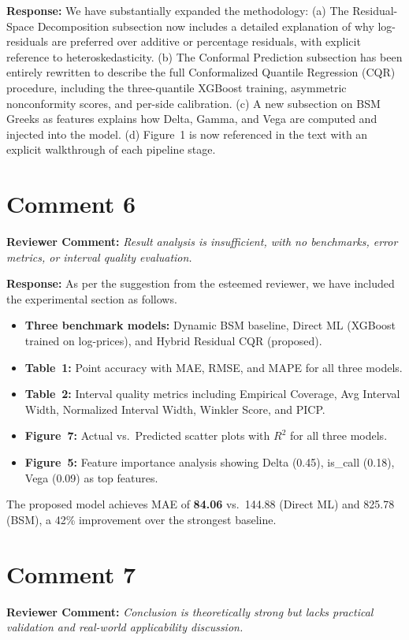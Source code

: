 \documentclass[11pt]{article}
\newcommand{\rev}[1]{\textbf{Reviewer Comment:} \textit{#1}}
\newcommand{\resp}[1]{\textbf{Response:} #1}
\begin{document}
\resp{We have substantially expanded the methodology: (a) The Residual-Space Decomposition subsection now includes a detailed explanation of why log-residuals are preferred over additive or percentage residuals, with explicit reference to heteroskedasticity. (b) The Conformal Prediction subsection has been entirely rewritten to describe the full Conformalized Quantile Regression (CQR) procedure, including the three-quantile XGBoost training, asymmetric nonconformity scores, and per-side calibration. (c) A new subsection on BSM Greeks as features explains how Delta, Gamma, and Vega are computed and injected into the model. (d) Figure~1 is now referenced in the text with an explicit walkthrough of each pipeline stage.}

\section*{Comment 6}
\rev{Result analysis is insufficient, with no benchmarks, error metrics, or interval quality evaluation.}

\resp{As per the suggestion from the esteemed reviewer, we have included the experimental section as follows. 
\begin{itemize}[nosep]
    \item \textbf{Three benchmark models:} Dynamic BSM baseline, Direct ML (XGBoost trained on log-prices), and Hybrid Residual CQR (proposed).
    \item \textbf{Table~1:} Point accuracy with MAE, RMSE, and MAPE for all three models.
    \item \textbf{Table~2:} Interval quality metrics including Empirical Coverage, Avg Interval Width, Normalized Interval Width, Winkler Score, and PICP.
    \item \textbf{Figure~7:} Actual vs.\ Predicted scatter plots with $R^2$ for all three models.
    \item \textbf{Figure~5:} Feature importance analysis showing Delta (0.45), is\_call (0.18), Vega (0.09) as top features.
\end{itemize}
The proposed model achieves MAE of \textbf{84.06} vs.\ 144.88 (Direct ML) and 825.78 (BSM), a 42\% improvement over the strongest baseline.}

\section*{Comment 7}
\rev{Conclusion is theoretically strong but lacks practical validation and real-world applicability discussion.}
\end{document}
